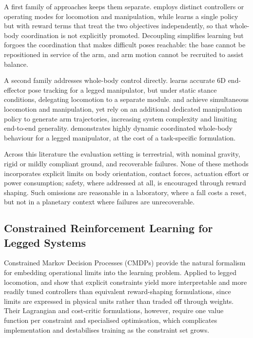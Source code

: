 A first family of approaches keeps them separate. \citet{Ma2022Locomanip} employs distinct controllers or operating modes for locomotion and manipulation, while \citet{fu2022deep} learns a single policy but with reward terms that treat the two objectives independently, so that whole-body coordination is not explicitly promoted. Decoupling simplifies learning but forgoes the coordination that makes difficult poses reachable: the base cannot be repositioned in service of the arm, and arm motion cannot be recruited to assist balance.

A second family addresses whole-body control directly. \citet{portela2025wholebodyendeffectorposetracking} learns accurate 6D end-effector pose tracking for a legged manipulator, but under static stance conditions, delegating locomotion to a separate module. \citet{ha2024umilegs} and \citet{He2024} achieve simultaneous locomotion and manipulation, yet rely on an additional dedicated manipulation policy to generate arm trajectories, increasing system complexity and limiting end-to-end generality. \citet{MaBadminton} demonstrates highly dynamic coordinated whole-body behaviour for a legged manipulator, at the cost of a task-specific formulation.

Across this literature the evaluation setting is terrestrial, with nominal gravity, rigid or mildly compliant ground, and recoverable failures. None of these methods incorporates explicit limits on body orientation, contact forces, actuation effort or power consumption; safety, where addressed at all, is encouraged through reward shaping. Such omissions are reasonable in a laboratory, where a fall costs a reset, but not in a planetary context where failures are unrecoverable.

\subsection{Constrained Reinforcement Learning for Legged Systems}

Constrained Markov Decision Processes (CMDPs) \citep{achiam2017constrained} provide the natural formalism for embedding operational limits into the learning problem. Applied to legged locomotion, \citet{LeeCRL} and \citet{KimNotOnlyRewards} show that explicit constraints yield more interpretable and more readily tuned controllers than equivalent reward-shaping formulations, since limits are expressed in physical units rather than traded off through weights. Their Lagrangian and cost-critic formulations, however, require one value function per constraint and specialised optimisation, which complicates implementation and destabilises training as the constraint set grows.

